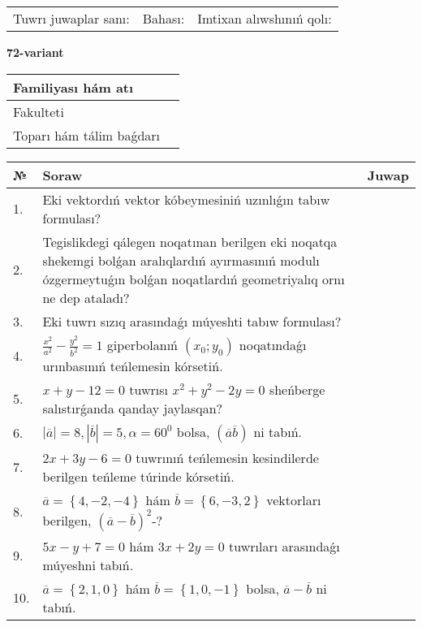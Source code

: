 \documentclass{article}
\begin{document}
\vspace{1cm}

\begin{tabular}{lll}
Tuwrı juwaplar sanı: \underline{\hspace{1.5cm}} & 
Bahası: \underline{\hspace{1.5cm}} & 
Imtixan alıwshınıń qolı: \underline{\hspace{2cm}} \\
\end{tabular}

\egroup

\newpage


\textbf{72-variant}\\

\bgroup
\def\arraystretch{1.6} %

\begin{tabular}{|m{5.7cm}|m{9.5cm}|}
\hline
Familiyası hám atı & \\
\hline
Fakulteti  & \\
\hline
Toparı hám tálim baǵdarı  & \\
\hline
\end{tabular}

\vspace{1cm}

\begin{tabular}{|m{0.7cm}|m{10cm}|m{4cm}|}
\hline
№ & Soraw & Juwap \\
\hline
1. & Eki vektordıń vektor kóbeymesiniń uzınlıǵın tabıw formulası? &  \\
\hline
2. & Tegislikdegi qálegen noqatınan berilgen eki noqatqa shekemgi bolǵan aralıqlardıń ayırmasınıń modulı ózgermeytuǵın bolǵan noqatlardıń geometriyalıq ornı ne dep ataladı? &  \\
\hline
3. & Eki tuwrı sızıq arasındaǵı múyeshti tabıw formulası? &  \\
\hline
4. & $\frac{x^2}{a^2}-\frac{y^2}{b^2}=1$ giperbolanıń $(x_0;y_0)$ noqatındaǵı urınbasınıń teńlemesin kórsetiń. &  \\
\hline
5. & $x+y-12=0$ tuwrısı $x^{2}+y^{2}-2y=0$ sheńberge salıstırǵanda qanday jaylasqan? &  \\
\hline
6. & $\left| \overline{a} \right|=8, \left| \overline{b} \right|=5, \alpha=60^{0}$ bolsa, $( \overline{a}\overline{b} )$ ni tabıń. &  \\
\hline
7. & $2x+3y-6=0$ tuwrınıń teńlemesin kesindilerde berilgen teńleme túrinde kórsetiń. &  \\
\hline
8. & $\overline{a}=\left\{ 4,-2,-4 \right\}$ hám $\overline{b}=\left\{ 6,-3, 2 \right\}$ vektorları berilgen, $(\overline{a}-\overline{b}) ^{2}$-? &  \\
\hline
9. & $5x-y+7=0$ hám $3x+2y=0$ tuwrıları arasındaǵı múyeshni tabıń. &  \\
\hline
10. & $\overline{a}=\left\{ 2, 1, 0 \right\}$ hám $\overline{b}=\left\{ 1, 0,-1 \right\}$ bolsa, $\overline{a}-\overline{b}$ ni tabıń. &  \\
\hline
\end{tabular}
\end{document}
